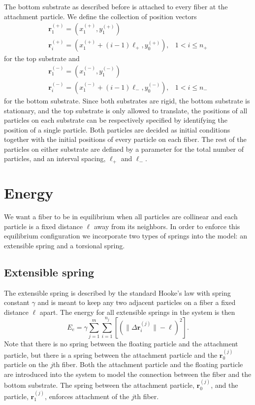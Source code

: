 	The bottom substrate as described before is attached to every fiber at the attachment particle. We define the collection of position vectors
\begin{eqnarray}
	\textbf{r}_1^{(+)} = (x_1^{(+)},y_1^{(+)}) & \\
	\textbf{r}_i^{(+)} = (x_1^{(+)} + (i-1)\ell_+,y_0^{(+)}), & 1 < i \leq n_+
\end{eqnarray}
for the top substrate and
\begin{eqnarray}
	\textbf{r}_1^{(-)} = (x_1^{(-)},y_1^{(-)}) & \\
	\textbf{r}_i^{(-)} = (x_1^{(-)} + (i-1)\ell_-,y_0^{(-)}), & 1 < i \leq n_-
\end{eqnarray} 
for the bottom substrate. Since both substrates are rigid, the bottom substrate is stationary, and the top substrate is only allowed to translate, the positions of all particles on each substrate can be respectively specified by identifying the position of a single particle. Both particles are decided as initial conditions together with the initial positions of every particle on each fiber. The rest of the particles on either substrate are defined by a parameter for the total number of particles, and an interval spacing, $\ell_+$ and $\ell_-$.

\section{Energy}

	We want a fiber to be in equilibrium when all particles are collinear and each particle is a fixed distance $\ell$ away from its neighbors. In order to enforce this equilibrium configuration we incorporate two types of springs into the model: an extensible spring and a torsional spring.

\subsection{Extensible spring}

	The extensible spring is described by the standard Hooke's law with spring constant $\gamma$ and is meant to keep any two adjacent particles on a fiber a fixed distance $\ell$ apart. The energy for all extensible springs in the system is then
\begin{equation}
	E_e = \gamma \sum_{j=1}^m \sum_{i=1}^{n_j} \left[ \left( \|\Delta \textbf{r}_i^{(j)} \| - \ell \right)^2 \right].
\end{equation}
Note that there is no spring between the floating particle and the attachment particle, but there is a spring between the attachment particle and the $\textbf{r}_0^{(j)}$ particle on the $j$th fiber. Both the attachment particle and the floating particle are introduced into the system to model the connection between the fiber and the bottom substrate. The spring between the attachment particle, $\textbf{r}_0^{(j)}$, and the particle, $\textbf{r}_1^{(j)}$, enforces attachment of the $j$th fiber.

